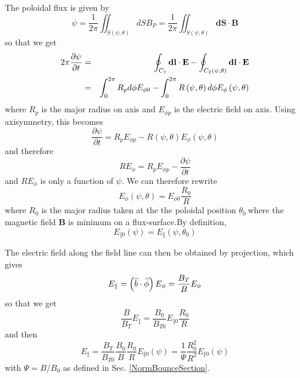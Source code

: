The poloidal flux is given by
\begin{equation}
\psi =\frac{1}{2\pi }\iint_{S\left( \psi ,\theta \right) }dSB_{P}=\frac{1}{2%
\pi }\iint_{S\left( \psi ,\theta \right) }\mathbf{dS\cdot B}
\end{equation}
so that we get
\begin{eqnarray}
2\pi \frac{\partial \psi }{\partial t} &=&\oint_{C_{1}}\mathbf{dl}\cdot
\mathbf{E}-\oint_{C_{2}\left( \psi ,\theta \right) }\mathbf{dl}\cdot \mathbf{%
E} \\
&=&\int_{0}^{2\pi }R_{p}d\phi E_{\phi 0}-\int_{0}^{2\pi }R\left( \psi
,\theta \right) d\phi E_{\phi }\left( \psi ,\theta \right)
\end{eqnarray}
where $R_{p}$ is the major radius on axis and $E_{\phi p}$ is the electric
field on axis. Using axisymmetry, this becomes
\begin{equation}
\frac{\partial \psi }{\partial t}=R_{p}E_{\phi p}-R\left( \psi ,\theta
\right) E_{\phi }\left( \psi ,\theta \right)
\end{equation}
and therefore
\begin{equation}
RE_{\phi }=R_{p}E_{\phi p}-\frac{\partial \psi }{\partial t}
\end{equation}
and $RE_{\phi }$ is only a function of $\psi $. We can therefore rewrite
\begin{equation}
E_{\phi }\left( \psi ,\theta \right) =E_{\phi 0}\frac{R_{0}}{R}
\end{equation}
where $R_{0}$ is the major radius taken at the the poloidal position $\theta
_{0}\ $where the magnetic field $\mathbf{B}$ is minimum on a flux-surface.By
definition,
\begin{equation}
E_{\Vert 0}\left( \psi \right) =E_{\Vert }\left( \psi ,\theta _{0}\right)
\end{equation}

The electric field along the field line can then be obtained by projection,
which gives
\begin{equation}
E_{\Vert }=\left( \widehat{b}\cdot \widehat{\phi }\right) E_{\phi }=\frac{%
B_{T}}{B}E_{\phi }
\end{equation}
so that we get
\begin{equation}
\frac{B}{B_{T}}E_{\Vert }=\frac{B_{0}}{B_{T0}}E_{\Vert 0}\frac{R_{0}}{R}
\end{equation}
and then
\begin{equation}
E_{\Vert }=\frac{B_{T}}{B_{T0}}\frac{B_{0}}{B}\frac{R_{0}}{R}E_{\Vert
0}\left( \psi \right) =\frac{1}{\Psi }\frac{R_{0}^{2}}{R^{2}}E_{\Vert
0}\left( \psi \right) \label{efieldpar}
\end{equation}
with $\Psi =B/B_{0}$ as defined in Sec. \ref{NormBounceSection}.

